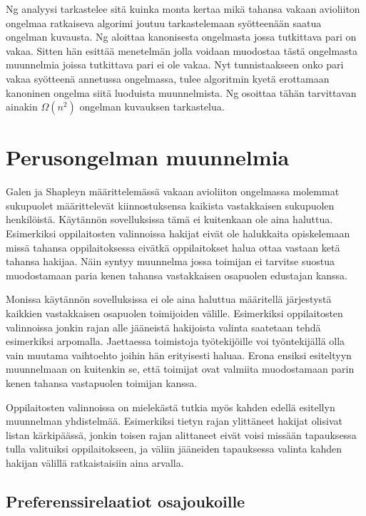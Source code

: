 \documentclass[gradu, twoside]{tktltiki}
\begin{document}
Ng analyysi tarkastelee sitä kuinka monta kertaa mikä tahansa vakaan
avioliiton ongelmaa ratkaiseva algorimi joutuu tarkastelemaan
syötteenään saatua ongelman kuvausta. Ng aloittaa kanonisesta
ongelmasta jossa tutkittava pari on vakaa. Sitten hän esittää
menetelmän jolla voidaan muodostaa tästä ongelmasta muunnelmia joissa
tutkittava pari ei ole vakaa. Nyt tunnistaakseen onko pari vakaa
syötteenä annetussa ongelmassa, tulee algoritmin kyetä erottamaan
kanoninen ongelma siitä luoduista muunnelmista. Ng osoittaa tähän
tarvittavan ainakin $\Omega(n^2)$ ongelman kuvauksen tarkastelua.
\cite{cheng89}

\section{Perusongelman muunnelmia}

Galen ja Shapleyn määrittelemässä vakaan avioliiton ongelmassa
molemmat sukupuolet määrittelevät kiinnostuksensa kaikista
vastakkaisen sukupuolen henkilöistä. Käytännön sovelluksissa tämä ei
kuitenkaan ole aina haluttua. Esimerkiksi oppilaitosten valinnoissa
hakijat eivät ole halukkaita opiskelemaan missä tahansa
oppilaitoksessa eivätkä oppilaitokset halua ottaa vastaan ketä tahansa
hakijaa. Näin syntyy muunnelma jossa toimijan ei tarvitse suostua
muodostamaan paria kenen tahansa vastakkaisen osapuolen edustajan
kanssa.

Monissa käytännön sovelluksissa ei ole aina haluttua määritellä
järjestystä kaikkien vastakkaisen osapuolen toimijoiden välille.
Esimerkiksi oppilaitosten valinnoissa jonkin rajan alle jääneistä
hakijoista valinta saatetaan tehdä esimerkiksi arpomalla. Jaettaessa
toimistoja työtekijöille voi työntekijällä olla vain muutama
vaihtoehto joihin hän erityisesti haluaa. Erona ensiksi esiteltyyn
muunnelmaan on kuitenkin se, että toimijat ovat valmiita muodostamaan
parin kenen tahansa vastapuolen toimijan kanssa.

Oppilaitosten valinnoissa on mielekästä tutkia myös kahden edellä
esitellyn muunnelman yhdistelmää. Esimerkiksi tietyn rajan
ylittäneet hakijat olisivat listan kärkipäässä, jonkin toisen rajan
alittaneet eivät voisi missään tapauksessa tulla valituiksi
oppilaitokseen, ja väliin jääneiden tapauksessa valinta kahden hakijan
välillä ratkaistaisiin aina arvalla.

\subsection{Preferenssirelaatiot osajoukoille}
\end{document}
